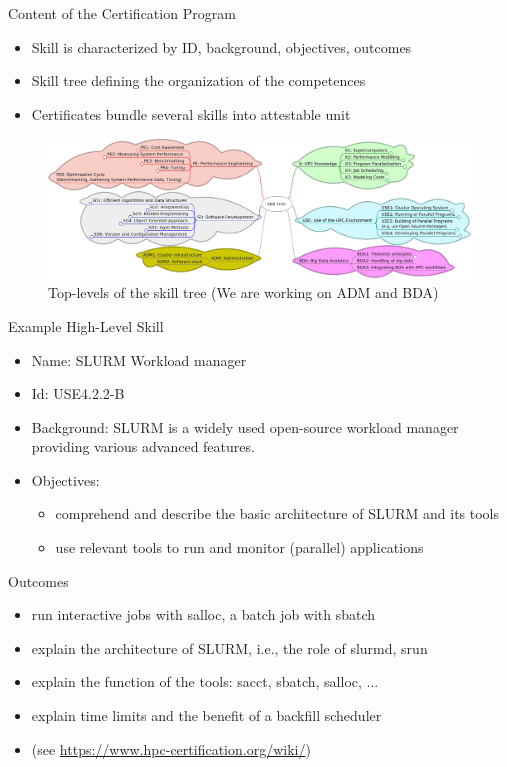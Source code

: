 \documentclass[compress,aspectratio=169]{beamer}
\begin{document}
\begin{frame}{Content of the Certification Program}
	\begin{itemize}
		\item Skill is characterized by ID, background, objectives, outcomes
		\item Skill tree defining the organization of the competences
		\item Certificates bundle several skills into attestable unit
	\end{itemize}

		\begin{figure}
			\includegraphics[width=\textwidth]{skill-tree}
			\caption{Top-levels of the skill tree (We are working on ADM and BDA)}
		\end{figure}
\end{frame}


\begin{frame}{Example High-Level Skill}

	\begin{itemize}
		\item Name: SLURM Workload manager
		\item Id: USE4.2.2-B
		\item Background: {\small SLURM is a widely used open-source workload manager providing various advanced features.}
		\item Objectives:
		\begin{itemize}
			\item comprehend and describe the basic architecture of SLURM and its tools
			\item use relevant tools to run and monitor (parallel) applications
		\end{itemize}
	\end{itemize}

	\begin{block}{Outcomes}
		\begin{itemize}
			\item run interactive jobs with salloc, a batch job with sbatch
			\item explain the architecture of SLURM, i.e., the role of slurmd, srun
			\item explain the function of the tools: sacct, sbatch, salloc, ...
			\item explain time limits and the benefit of a backfill scheduler
			\item (see \url{https://www.hpc-certification.org/wiki/})
		\end{itemize}
	\end{block}
\end{frame}
\end{document}
